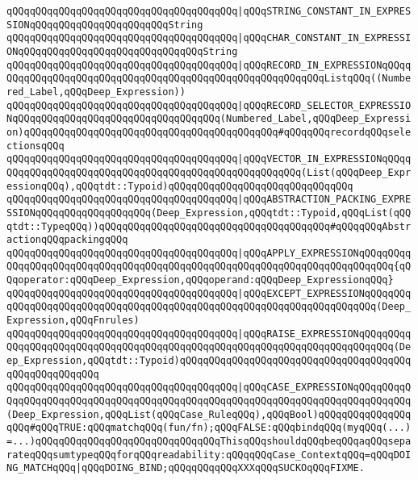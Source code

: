 \verb|qQQqqQQqqQQqqQQqqQQqqQQqqQQqqQQqqQQqqQQq|\verb#|qQQqSTRING_CONSTANT_IN_EXPRESSIONqQQqqQQqqQQqqQQqqQQqqQQqString#\newline
\verb|qQQqqQQqqQQqqQQqqQQqqQQqqQQqqQQqqQQqqQQq|\verb#|qQQqCHAR_CONSTANT_IN_EXPRESSIONqQQqqQQqqQQqqQQqqQQqqQQqqQQqqQQqString#\newline
\verb|qQQqqQQqqQQqqQQqqQQqqQQqqQQqqQQqqQQqqQQq|\verb#|qQQqRECORD_IN_EXPRESSIONqQQqqQQqqQQqqQQqqQQqqQQqqQQqqQQqqQQqqQQqqQQqqQQqqQQqqQQqqQQqListqQQq((Numbered_Label,qQQqDeep_Expression))#\newline
\verb|qQQqqQQqqQQqqQQqqQQqqQQqqQQqqQQqqQQqqQQq|\verb#|qQQqRECORD_SELECTOR_EXPRESSIONqQQqqQQqqQQqqQQqqQQqqQQqqQQqqQQqqQQq(Numbered_Label,qQQqDeep_Expression)qQQqqQQqqQQqqQQqqQQqqQQqqQQqqQQqqQQqqQQqqQQq#\verb|#qQQqqQQqrecordqQQqselectionsqQQq|\newline
\verb|qQQqqQQqqQQqqQQqqQQqqQQqqQQqqQQqqQQqqQQq|\verb#|qQQqVECTOR_IN_EXPRESSIONqQQqqQQqqQQqqQQqqQQqqQQqqQQqqQQqqQQqqQQqqQQqqQQqqQQqqQQq(List(qQQqDeep_ExpressionqQQq),qQQqtdt::Typoid)qQQqqQQqqQQqqQQqqQQqqQQqqQQqqQQq#\newline
\verb|qQQqqQQqqQQqqQQqqQQqqQQqqQQqqQQqqQQqqQQq|\verb#|qQQqABSTRACTION_PACKING_EXPRESSIONqQQqqQQqqQQqqQQqqQQq(Deep_Expression,qQQqtdt::Typoid,qQQqList(qQQqtdt::TypeqQQq))qQQqqQQqqQQqqQQqqQQqqQQqqQQqqQQqqQQqqQQq#\verb|#qQQqqQQqAbstractionqQQqpackingqQQq|\newline
\verb|qQQqqQQqqQQqqQQqqQQqqQQqqQQqqQQqqQQqqQQq|\verb#|qQQqAPPLY_EXPRESSIONqQQqqQQqqQQqqQQqqQQqqQQqqQQqqQQqqQQqqQQqqQQqqQQqqQQqqQQqqQQqqQQqqQQqqQQqqQQq{qQQqoperator:qQQqDeep_Expression,qQQqoperand:qQQqDeep_ExpressionqQQq}#\newline
\verb|qQQqqQQqqQQqqQQqqQQqqQQqqQQqqQQqqQQqqQQq|\verb#|qQQqEXCEPT_EXPRESSIONqQQqqQQqqQQqqQQqqQQqqQQqqQQqqQQqqQQqqQQqqQQqqQQqqQQqqQQqqQQqqQQqqQQqqQQq(Deep_Expression,qQQqFnrules)#\newline
\verb|qQQqqQQqqQQqqQQqqQQqqQQqqQQqqQQqqQQqqQQq|\verb#|qQQqRAISE_EXPRESSIONqQQqqQQqqQQqqQQqqQQqqQQqqQQqqQQqqQQqqQQqqQQqqQQqqQQqqQQqqQQqqQQqqQQqqQQqqQQq(Deep_Expression,qQQqtdt::Typoid)qQQqqQQqqQQqqQQqqQQqqQQqqQQqqQQqqQQqqQQqqQQqqQQqqQQqqQQq#\newline
\verb|qQQqqQQqqQQqqQQqqQQqqQQqqQQqqQQqqQQqqQQq|\verb#|qQQqCASE_EXPRESSIONqQQqqQQqqQQqqQQqqQQqqQQqqQQqqQQqqQQqqQQqqQQqqQQqqQQqqQQqqQQqqQQqqQQqqQQqqQQqqQQq(Deep_Expression,qQQqList(qQQqCase_RuleqQQq),qQQqBool)qQQqqQQqqQQqqQQqqQQq#\verb|#qQQqTRUE:qQQqmatchqQQq(fun/fn);qQQqFALSE:qQQqbindqQQq(myqQQq(...)=...)qQQqqQQqqQQqqQQqqQQqqQQqqQQqqQQqThisqQQqshouldqQQqbeqQQqaqQQqseparateqQQqsumtypeqQQqforqQQqreadability:qQQqqQQqCase_ContextqQQq=qQQqDOING_MATCHqQQq|\verb#|qQQqDOING_BIND;qQQqqQQqqQQqXXXqQQqSUCKOqQQqFIXME.#\newline
